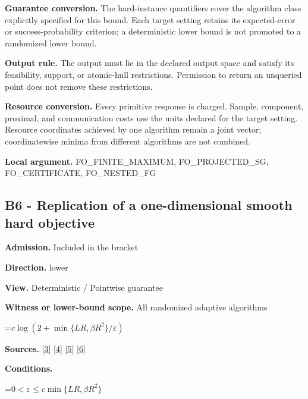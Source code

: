 \documentclass[10pt,a4paper]{article}
\newcommand{\AtlasMath}[1]{\par\begingroup\centering\setbox0=\hbox{$\displaystyle #1$}\ifdim\wd0>1.4\linewidth\typeout{ATLAS WIDE FORMULA: \the\wd0}\fi\ifdim\wd0>\linewidth\resizebox{\linewidth}{!}{\box0}\else\box0\fi\par\endgroup}
\begin{document}
\textbf{Guarantee conversion.} The hard-instance quantifiers cover the algorithm class explicitly specified for this bound. Each target setting retains its expected-error or success-probability criterion; a deterministic lower bound is not promoted to a randomized lower bound.



\textbf{Output rule.} The output must lie in the declared output space and satisfy its feasibility, support, or atomic-hull restrictions. Permission to return an unqueried point does not remove these restrictions.



\textbf{Resource conversion.} Every primitive response is charged. Sample, component, proximal, and communication costs use the units declared for the target setting. Resource coordinates achieved by one algorithm remain a joint vector; coordinatewise minima from different algorithms are not combined.



\textbf{Local argument.} FO\_FINITE\_MAXIMUM, FO\_PROJECTED\_SG, FO\_CERTIFICATE, FO\_NESTED\_FG



\subsection{B6 - Replication of a one-dimensional smooth hard objective}


\textbf{Admission.} Included in the bracket



\textbf{Direction.} lower



\textbf{View.} Deterministic / Pointwise guarantee



\textbf{Witness or lower-bound scope.} All randomized adaptive algorithms



\AtlasMath{c\log(2+\min\{LR,\beta R^2\}/\varepsilon)}


\textbf{Sources.} \href{https://arxiv.org/pdf/2311.10886}{[3]} \href{https://arxiv.org/pdf/1405.4980}{[4]} \href{https://www2.isye.gatech.edu/~nemirovs/MOR_AccuracyCertificates.pdf}{[5]} \href{https://arxiv.org/pdf/2609.20701}{[6]}



\textbf{Conditions.}
\AtlasMath{0<\varepsilon\le c\min\{LR,\beta R^2\}}
\end{document}
